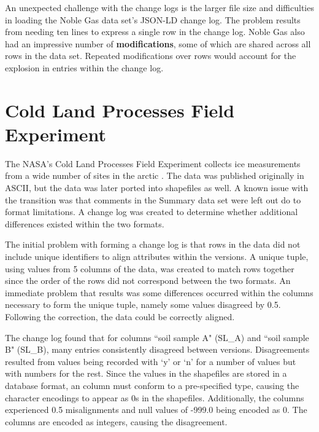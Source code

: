 An unexpected challenge with the change logs is the larger file size and difficulties in loading the Noble Gas data set's JSON-LD change log.
The problem results from needing ten lines to express a single row in the change log.
Noble Gas also had an impressive number of \textbf{modifications}, some of which are shared across all rows in the data set.
Repeated modifications over rows would account for the explosion in entries within the change log.

\section{Cold Land Processes Field Experiment}

The NASA's Cold Land Processes Field Experiment collects ice measurements from a wide number of sites in the arctic \cite{CLPX}.
The data was published originally in ASCII, but the data was later ported into shapefiles as well.
A known issue with the transition was that comments in the Summary data set were left out do to format limitations.
A change log was created to determine whether additional differences existed within the two formats.

The initial problem with forming a change log is that rows in the data did not include unique identifiers to align attributes within the versions.
A unique tuple, using values from 5 columns of the data, was created to match rows together since the order of the rows did not correspond between the two formats.
An immediate problem that results was some differences occurred within the columns necessary to form the unique tuple, namely some values disagreed by 0.5.
Following the correction, the data could be correctly aligned.

The change log found that for columns ``soil sample A" (SL\_A) and ``soil sample B" (SL\_B), many entries consistently disagreed between versions.
Disagreements resulted from values being recorded with `y' or `n' for a number of values but with numbers for the rest.
Since the values in the shapefiles are stored in a database format, an column must conform to a pre-specified type, causing the character encodings to appear as 0s in the shapefiles.
Additionally, the columns experienced 0.5 misalignments and null values of -999.0 being encoded as 0.
The columns are encoded as integers, causing the disagreement.

